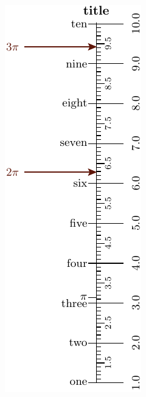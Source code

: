 \documentclass[a4paper,11pt,english]{sphinxmanual}
\begin{document}
\includegraphics{ex_axes_7_1.pdf}
\end{document}

